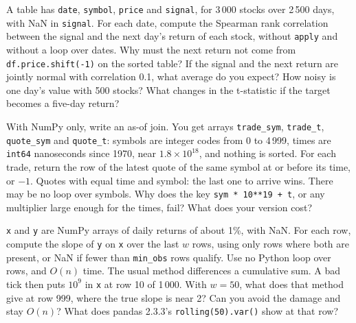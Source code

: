 \begin{question}\label{iq:iv3:python-and-pandas:38}
A table has \texttt{date}, \texttt{symbol}, \texttt{price} and \texttt{signal}, for 3\,000 stocks over 2\,500 days, with NaN in \texttt{signal}. For each date, compute the Spearman rank correlation between the signal and the next day's return of each stock, without \texttt{apply} and without a loop over dates. Why must the next return not come from \texttt{df.price.shift(-1)} on the sorted table? If the signal and the next return are jointly normal with correlation 0.1, what average do you expect? How noisy is one day's value with 500 stocks? What changes in the t-statistic if the target becomes a five-day return?
\end{question}

\begin{question}\label{iq:iv3:python-and-pandas:39}
With NumPy only, write an as-of join. You get arrays \texttt{trade\_sym}, \texttt{trade\_t}, \texttt{quote\_sym} and \texttt{quote\_t}: symbols are integer codes from 0 to 4\,999, times are \texttt{int64} nanoseconds since 1970, near $1.8 \times 10^{18}$, and nothing is sorted. For each trade, return the row of the latest quote of the same symbol at or before its time, or $-1$. Quotes with equal time and symbol: the last one to arrive wins. There may be no loop over symbols. Why does the key \texttt{sym * 10**19 + t}, or any multiplier large enough for the times, fail? What does your version cost?
\end{question}

\begin{question}\label{iq:iv3:python-and-pandas:40}
\texttt{x} and \texttt{y} are NumPy arrays of daily returns of about 1\%, with NaN. For each row, compute the slope of \texttt{y} on \texttt{x} over the last $w$ rows, using only rows where both are present, or NaN if fewer than \texttt{min\_obs} rows qualify. Use no Python loop over rows, and $O(n)$ time. The usual method differences a cumulative sum. A bad tick then puts $10^9$ in \texttt{x} at row 10 of 1\,000. With $w = 50$, what does that method give at row 999, where the true slope is near 2? Can you avoid the damage and stay $O(n)$? What does pandas 2.3.3's \texttt{rolling(50).var()} show at that row?
\end{question}
